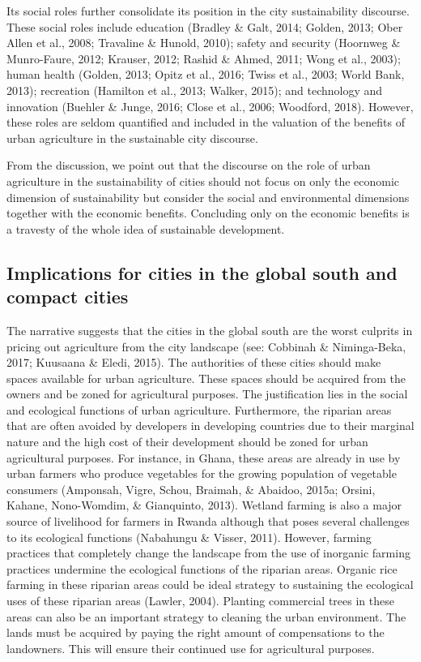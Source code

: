 Its social roles further consolidate its position in the city sustainability discourse. These social roles include education (Bradley \& Galt, 2014; Golden, 2013; Ober Allen et al., 2008; Travaline \& Hunold, 2010); safety and security (Hoornweg \& Munro-Faure, 2012; Krauser, 2012; Rashid \& Ahmed, 2011; Wong et al., 2003); human health (Golden, 2013; Opitz et al., 2016; Twiss et al., 2003; World Bank, 2013); recreation (Hamilton et al., 2013; Walker, 2015); and technology and innovation (Buehler \& Junge, 2016; Close et al., 2006; Woodford, 2018). However, these roles are seldom quantified and included in the valuation of the benefits of urban agriculture in the sustainable city discourse.

From the discussion, we point out that the discourse on the role of urban agriculture in the sustainability of cities should not focus on only the economic dimension of sustainability but consider the social and environmental dimensions together with the economic benefits. Concluding only on the economic benefits is a travesty of the whole idea of sustainable development.

\subsection{Implications for cities in the global south and compact cities}

The narrative suggests that the cities in the global south are the worst culprits in pricing out agriculture from the city landscape (see: Cobbinah \& Niminga-Beka, 2017; Kuusaana \& Eledi, 2015). The authorities of these cities should make spaces available for urban agriculture. These spaces should be acquired from the owners and be zoned for agricultural purposes. The justification lies in the social and ecological functions of urban agriculture. Furthermore, the riparian areas that are often avoided by developers in developing countries due to their marginal nature and the high cost of their development should be zoned for urban agricultural purposes. For instance, in Ghana, these areas are already in use by urban farmers who produce vegetables for the growing population of vegetable consumers (Amponsah, Vigre, Schou, Braimah, \& Abaidoo, 2015a; Orsini, Kahane, Nono-Womdim, \& Gianquinto, 2013). Wetland farming is also a major source of livelihood for farmers in Rwanda although that poses several challenges to its ecological functions (Nabahungu \& Visser, 2011). However, farming practices that completely change the landscape from the use of inorganic farming practices undermine the ecological functions of the riparian areas. Organic rice farming in these riparian areas could be ideal strategy to sustaining the ecological uses of these riparian areas (Lawler, 2004). Planting commercial trees in these areas can also be an important strategy to cleaning the urban environment. The lands must be acquired by paying the right amount of compensations to the landowners. This will ensure their continued use for agricultural purposes.

